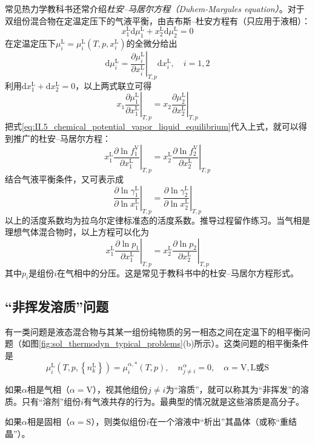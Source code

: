 \documentclass[main.tex]{subfiles}
\begin{document}
常见热力学教科书还常介绍\emph{杜安--马居尔方程（Duhem-Margules equation）}。对于双组份混合物在定温定压下的气液平衡，由吉布斯--杜安方程有（只应用于液相）：
\[x_1^\text{L}\mathrm{d}\mu_1^\text{L}+x_2^\text{L}\mathrm{d}\mu_2^\text{L}=0\]
在定温定压下$\mu_i^\text{L}=\mu_i^\text{L}\left(T,p,x_i^\text{L}\right)$的全微分给出
\[\mathrm{d}\mu_i^\text{L}=\left.\frac{\partial\mu_i^\text{L}}{\partial x_i^\text{L}}\right|_{T,p}\mathrm{d}x_i^\text{L},\quad i=1,2\]
利用$\mathrm{d}x_1^\text{L}+\mathrm{d}x_2^\text{L}=0$，以上两式联立可得
\[x_1\left.\frac{\partial\mu_1^\text{L}}{\partial x_1^\text{L}}\right|_{T,p}=x_2\left.\frac{\partial\mu_2^\text{L}}{\partial x_2^\text{L}}\right|_{T,p}\]
把式\eqref{eq:II.5_chemical_potential_vapor_liquid_equilibrium}代入上式，就可以得到推广的杜安--马居尔方程：
\[x_1^\text{L}\left.\frac{\partial\ln f_1^\text{V}}{\partial x_1^\text{L}}\right|_{T,p}=x_2^\text{L}\left.\frac{\partial\ln f_2^\text{V}}{\partial x_2^\text{L}}\right|_{T,p}\]
结合气液平衡条件，又可表示成
\[\left.\frac{\partial\ln\gamma_1^\text{L}}{\partial\ln x_1^\text{L}}\right|_{T,p}=\left.\frac{\partial\ln\gamma_2^\text{L}}{\partial\ln x_2^\text{L}}\right|_{T,p}\]
以上的活度系数均为拉乌尔定律标准态的活度系数。推导过程留作练习。当气相是理想气体混合物时，以上方程可以化为
\[x_1^\text{L}\left.\frac{\partial \ln p_1}{\partial x_1^\text{L}}\right|_{T,p}=x_2^\text{L}\left.\frac{\partial\ln p_2}{\partial x_2^\text{L}}\right|_{T,p}\]
其中$p_i$是组份$i$在气相中的分压。这是常见于教科书中的杜安--马居尔方程形式。

\subsection{“非挥发溶质”问题}\label{sec:II.5.3 non_volatile_solute}
有一类问题是液态混合物与其某一组份纯物质的另一相态之间在定温下的相平衡问题（如图\ref{fig:sol_thermodyn_typical_problems}(b)所示）。这类问题的相平衡条件是
\begin{equation}\label{eq:II.5_phase_eq_non_volatile}
  \mu_i^\text{L}\left(T,p,\left\{n_k^\text{L}\right\}\right)=\mu_i^{\alpha,*}\left(T,p\right),\quad n_{j\neq i}^\alpha=0,\quad \alpha=\text{V},\text{L或S}
\end{equation}

如果$\alpha$相是气相（$\alpha=\text{V}$），视其他组份$j\neq i$为“溶质”，就可以称其为“非挥发”的溶质。只有“溶剂”组份$i$有气液共存的行为。最典型的情况就是这些溶质是高分子。

如果$\alpha$相是固相（$\alpha=\text{S}$），则类似组份$i$在一个溶液中“析出”其晶体（或称“重结晶”）。
\end{document}
